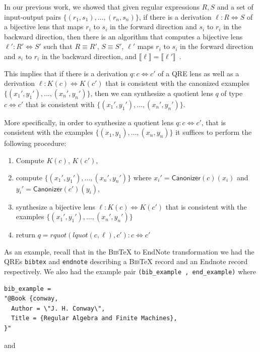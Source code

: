 \documentclass{svproc}
\newcommand{\cd}[1]{\lstinline[backgroundcolor=\color{white}]$#1$}
\newcommand{\kw}[1]{\ensuremath{\mathsf{#1}}}
\newcommand{\canonizer}{\ensuremath{\kw{Canonizer}}}
\newcommand{\bibtex}{\textsc{Bib}\TeX{}}
\begin{document}
In our previous work, we showed that given regular expressions $R, S$ and a set
of input-output pairs $\{(r_1, s_1), \ldots, (r_n, s_n)\}$, if there is a
derivation $\ell : R \Leftrightarrow S$ of a bijective lens that maps $r_i$ to
$s_i$ in the forward direction and $s_i$ to $r_i$ in the backward direction,
then there is an algorithm that computes a bijective lens $\ell' : R'
\Leftrightarrow S'$ such that $R \equiv R'$, $S \equiv S'$, $\ell'$ maps $r_i$
to $s_i$ in the forward direction and $s_i$ to $r_i$ in the backward direction,
and $\llbracket \ell \rrbracket = \llbracket \ell' \rrbracket$~\cite{popl18}.

This implies that if there is a derivation $q : c \Leftrightarrow
c'$ of a QRE lens as well as a derivation $\ell : K(c) \Leftrightarrow K(c')$
that is consistent with the canonized examples $\{({x_1}', {y_1}'),
\ldots, ({x_n}', {y_n}')\}$, then we can synthesize a quotient lens $q$ of
type $c \Leftrightarrow c'$ that is consistent with $\{({x_1}', {y_1}'),
\ldots, ({x_n}', {y_n}')\}$.

More specifically, in order to synthesize a quotient lens $q: c \Leftrightarrow
c'$, that is consistent with the examples $\{(x_1, y_1), \ldots, (x_n, y_n)\}$
 it suffices to perform the following procedure:
\begin{enumerate}
  \item
  Compute $K(c)$, $K(c')$,
  \item
  compute $\{({x_1}', {y_1}'), \ldots, ({x_n}', {y_n}')\}$ where ${x_i}' =
  \canonizer(c)(x_i)$ and ${y_i}' = \canonizer(c')(y_i)$,
  \item
    synthesize a bijective lens $\ell : K(c) \Leftrightarrow K(c')$ that is
    consistent with the examples $\{({x_1}', {y_1}'), \ldots, ({x_n}',
    {y_n}')\}$
  \item 
  return $q = \mathit{rquot}(\mathit{lquot}(c, \ell), c') : c \Leftrightarrow
  c'$
\end{enumerate}
As an example, recall that
in the \bibtex{} to EndNote transformation we had the QREs \cd{bibtex} and \cd{endnote} describing a \bibtex{} record and an
Endnote record respectively. We also had the example pair 
\cd{(bib_example , end_example)} where

\begin{lstlisting}
bib_example = 
"@Book {conway,
  Author = \"J. H. Conway\",
  Title = {Regular Algebra and Finite Machines},
}"
\end{lstlisting}

\noindent and
\end{document}

